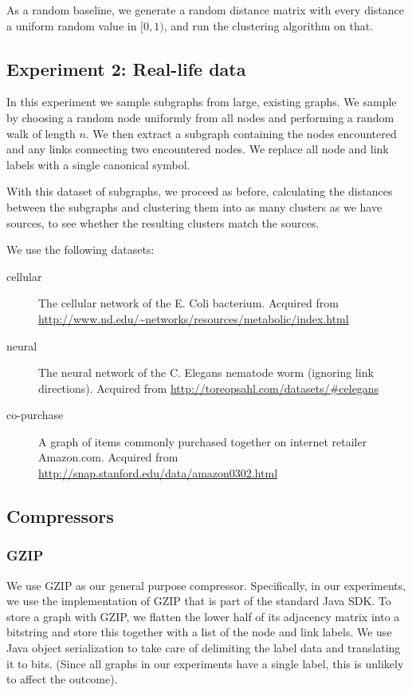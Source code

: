 \documentclass{article}
\begin{document}
As a random baseline, we generate a random distance matrix with every distance a uniform random value in $[0, 1)$, and run the clustering algorithm on that.

\subsection*{Experiment 2: Real-life data} 

In this experiment we sample subgraphs from large, existing graphs. We sample by choosing a  random node uniformly from all nodes and performing a random walk of length $n$. We then extract a subgraph containing the nodes encountered and any links connecting two encountered nodes. We replace all node and link labels with a single canonical symbol.

With this dataset of subgraphs, we proceed as before, calculating the distances between the subgraphs and clustering them into as many clusters as we have sources, to see whether the resulting clusters match the sources.

We use the following datasets:
\begin{description}
	\item[cellular] The cellular network of the E. Coli bacterium. \cite{jeong2000large} Acquired from \url{http://www.nd.edu/~networks/resources/metabolic/index.html}
	\item[neural] The neural network of the C. Elegans nematode worm (ignoring link directions). \cite{achacoso1991ay,watts1998collective} Acquired from \url{http://toreopsahl.com/datasets/#celegans}
	\item[co-purchase] A graph of items commonly purchased together on internet retailer Amazon.com. \cite{leskovec2007dynamics} Acquired from \url{http://snap.stanford.edu/data/amazon0302.html}
\end{description}

\subsection*{Compressors}

\subsubsection*{GZIP}

We use GZIP as our general purpose compressor. Specifically, in our experiments, we use the implementation of GZIP that is part of the standard Java SDK. To store a graph with GZIP, we flatten the lower half of its adjacency matrix into a bitstring and store this together with a list of the node and link labels. We use Java object serialization to take care of delimiting the label data and translating it to bits. (Since all graphs in our experiments have a single label, this is unlikely to affect the outcome).
\end{document}
